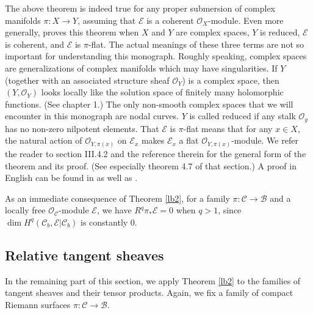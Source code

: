 \documentclass[12pt,b5paper,notitlepage]{report}
\theoremstyle{definition}
\theoremstyle{plain}
\newcommand{\mc}{\mathcal}
\newcommand{\scr}{\mathscr}
\numberwithin{equation}{section}
\begin{document}
The above theorem is indeed true for any proper submersion of complex manifolds $\pi:X\rightarrow Y$, assuming that $\scr E$ is a coherent $\scr O_X$-module. Even more generally, \cite{Gra60} proves this theorem when $X$ and $Y$ are complex spaces, $Y$ is reduced, $\scr E$ is coherent, and $\scr E$ is $\pi$-flat. The actual meanings of these three terms are not so important for understanding this monograph. Roughly speaking, complex spaces are generalizations of complex manifolds which may have singularities. If $Y$ (together with an associated structure sheaf $\scr O_Y$) is a complex space, then $(Y,\scr O_Y)$ looks locally like the solution space of finitely many holomorphic functions. (See  \cite{GR84} chapter 1.) The only non-smooth complex spaces that we will encounter in this monograph are nodal curves. $Y$ is called reduced if any stalk $\scr O_y$ has no non-zero nilpotent elements. That $\scr E$ is $\pi$-flat means that for any $x\in X$, the natural action of $\scr O_{Y,\pi(x)}$ on $\scr E_x$ makes $\scr E_x$ a flat $\scr O_{Y,\pi(x)}$-module. We refer the reader to \cite{GPR94} section III.4.2 and the reference therein for the general form of the theorem and its proof. (See especially theorem 4.7 of that section.) A proof in English can be found in \cite[Thm. III.4.12]{BS76} as well as \cite[Thm. 9.4.8]{EP96}.


As an immediate consequence of  Theorem \ref{lb2}, for a family $\pi:\mc C\rightarrow \mc B$ and a locally free $\scr O_{\mc C}$-module $\scr E$, we have $R^q\pi_*\scr E=0$ when $q>1$, since $\dim H^q(\mc C_b,\scr E|\mc C_b)$ is constantly $0$. 






\subsection*{Relative tangent sheaves}


In the remaining part of this section, we apply Theorem \ref{lb2} to the families of tangent sheaves and their tensor products. Again, we fix a family of compact Riemann surfaces $\pi:\mc C\rightarrow\mc B$.
\end{document}
